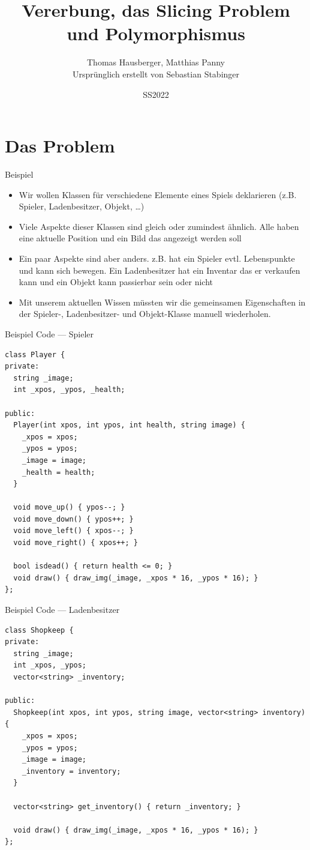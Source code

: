 \documentclass[presentation]{beamer}
\author{Thomas Hausberger, Matthias Panny \\ Ursprünglich erstellt von Sebastian Stabinger}
\date{SS2022}
\title{Vererbung, das Slicing Problem und Polymorphismus}
\begin{document}
\maketitle

\section{Das Problem}
\label{sec:org9e3a6a5}
\begin{frame}[label={sec:org8803f1d}]{Beispiel}
\begin{itemize}
\item Wir wollen Klassen für verschiedene Elemente eines Spiels
deklarieren (z.B. Spieler, Ladenbesitzer, Objekt, \ldots{})
\item Viele Aspekte dieser Klassen sind gleich oder zumindest ähnlich.
Alle haben eine aktuelle Position und ein Bild das angezeigt werden
soll
\item Ein paar Aspekte sind aber anders. z.B. hat ein Spieler evtl.
Lebenspunkte und kann sich bewegen. Ein Ladenbesitzer hat ein
Inventar das er verkaufen kann und ein Objekt kann passierbar sein
oder nicht
\item Mit unserem aktuellen Wissen müssten wir die gemeinsamen
Eigenschaften in der Spieler-, Ladenbesitzer- und Objekt-Klasse
manuell wiederholen.
\end{itemize}
\end{frame}
\begin{frame}[label={sec:orgb022c8d},fragile]{Beispiel Code --- Spieler}
 \begin{verbatim}
class Player {
private:
  string _image;
  int _xpos, _ypos, _health;

public:
  Player(int xpos, int ypos, int health, string image) {
    _xpos = xpos;
    _ypos = ypos;
    _image = image;
    _health = health;
  }

  void move_up() { ypos--; }
  void move_down() { ypos++; }
  void move_left() { xpos--; }
  void move_right() { xpos++; }

  bool isdead() { return health <= 0; }
  void draw() { draw_img(_image, _xpos * 16, _ypos * 16); }
};
\end{verbatim}
\end{frame}
\begin{frame}[label={sec:orgf9e1283},fragile]{Beispiel Code --- Ladenbesitzer}
 \begin{verbatim}
class Shopkeep {
private:
  string _image;
  int _xpos, _ypos;
  vector<string> _inventory;

public:
  Shopkeep(int xpos, int ypos, string image, vector<string> inventory) {
    _xpos = xpos;
    _ypos = ypos;
    _image = image;
    _inventory = inventory;
  }

  vector<string> get_inventory() { return _inventory; }

  void draw() { draw_img(_image, _xpos * 16, _ypos * 16); }
};
\end{verbatim}
\end{frame}
\end{document}
